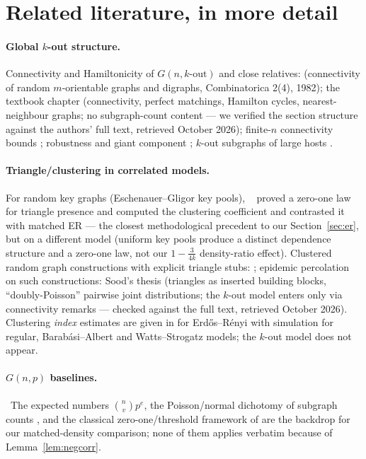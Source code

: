 \documentclass[11pt,a4paper]{article}
\theoremstyle{definition}
\theoremstyle{definition}
\begin{document}
\section{Related literature, in more detail}\label{sec:related}

\paragraph{Global $k$-out structure.} Connectivity and Hamiltonicity of
$G(n,k\text{-out})$ and close relatives: \cite{fennerFrieze1982}
(connectivity of random $m$-orientable graphs and digraphs, Combinatorica 2(4),
1982); the textbook chapter \cite[Ch.~22]{friezeKaronski2015} (connectivity,
perfect matchings, Hamilton cycles, nearest-neighbour graphs; no subgraph-count
content — we verified the section structure against the authors' full text,
retrieved October 2026); finite-$n$ connectivity bounds \cite{soodYagan2020};
robustness and giant component \cite{elumarSoodYagan2023}; $k$-out subgraphs of
large hosts \cite{friezeJohansson2014}.

\paragraph{Triangle/clustering in correlated models.} For random key graphs
(Eschenauer--Gligor key pools), \ \cite{yaganMakowski2009} proved a zero-one law
for triangle presence and \cite{yaganMakowski2017} computed the clustering
coefficient and contrasted it with matched ER — the closest methodological
precedent to our Section~\ref{sec:er}, but on a different model (uniform key pools
produce a distinct dependence structure and a zero-one law, not our
$1-\tfrac{3}{4k}$ density-ratio effect). Clustered random graph constructions with
explicit triangle stubs: \cite{newman2009}; epidemic percolation on such
constructions: Sood's thesis \cite{sood2024thesis} (triangles as inserted building
blocks, ``doubly-Poisson'' pairwise joint distributions; the $k$-out model enters
only via connectivity remarks — checked against the full text, retrieved October
2026).
Clustering \emph{index} estimates are given in \cite{islakYesiloglu2024} for
Erd\H{o}s--R\'enyi with simulation for regular, Barab\'asi--Albert and
Watts--Strogatz models; the $k$-out model does not appear.

\paragraph{$G(n,p)$ baselines.} \ The expected numbers
$\binom{n}{v}p^{e}$, the Poisson/normal dichotomy of subgraph counts
\cite{jansonLuczakRucinski2000}, and the classical zero-one/threshold framework of
\cite{bollobas2001} are the backdrop for our matched-density comparison; none of
them applies verbatim because of Lemma~\ref{lem:negcorr}.
\end{document}
